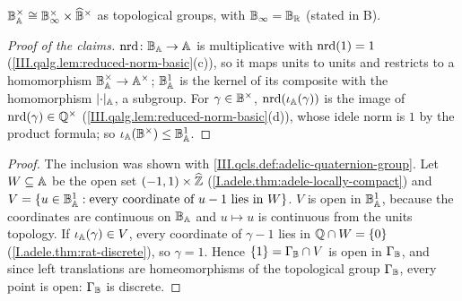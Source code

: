 \begin{definition}
\end{definition}
\noindent $\mathbb{B}_{\mathbb{A}}^\times\cong\mathbb{B}_{\infty}^\times\times\widehat{\mathbb{B}}^\times$ as topological groups, with $\mathbb{B}_{\infty}=\mathbb{B}_{\mathbb{R}}$ (stated in B).
\begin{proof}[Proof of the claims]
$\operatorname{nrd}\colon\mathbb{B}_{\mathbb{A}}\to\mathbb{A}$ is multiplicative with $\operatorname{nrd}(1)=1$ (\cref{III.qalg.lem:reduced-norm-basic}(c)), so it maps units to units and restricts to a
homomorphism $\mathbb{B}_{\mathbb{A}}^\times\to\mathbb{A}^\times$; $\mathbb{B}_{\mathbb{A}}^1$ is the kernel of its composite with the homomorphism $\lvert\cdot\rvert_{\mathbb{A}}$, a subgroup. For $\gamma\in\mathbb{B}^\times$,
$\operatorname{nrd}(\iota_{\mathbb{A}}(\gamma))$ is the image of $\operatorname{nrd}(\gamma)\in\mathbb{Q}^\times$ (\cref{III.qalg.lem:reduced-norm-basic}(d)), whose idele norm is $1$ by the product
formula; so $\iota_{\mathbb{A}}(\mathbb{B}^\times)\le\mathbb{B}_{\mathbb{A}}^1$.
\end{proof}

\begin{theorem}[discreteness]
\end{theorem}
\begin{proof}
The inclusion was shown with \cref{III.qcls.def:adelic-quaternion-group}. Let $W\subseteq\mathbb{A}$ be the open set $(-1,1)\times\widehat{\mathbb{Z}}$
(\cref{I.adele.thm:adele-locally-compact}) and $V=\{u\in\mathbb{B}_{\mathbb{A}}^1:\text{every coordinate of }u-1\text{ lies in }W\}$. $V$ is open in $\mathbb{B}_{\mathbb{A}}^1$, because the
coordinates are continuous on $\mathbb{B}_{\mathbb{A}}$ and $u\mapsto u$ is continuous from the units topology. If $\iota_{\mathbb{A}}(\gamma)\in V$, every coordinate of $\gamma-1$ lies in
$\mathbb{Q}\cap W=\{0\}$ (\cref{I.adele.thm:rat-discrete}), so $\gamma=1$. Hence $\{1\}=\Gamma_{\mathbb{B}}\cap V$ is open in $\Gamma_{\mathbb{B}}$, and since left translations are
homeomorphisms of the topological group $\Gamma_{\mathbb{B}}$, every point is open: $\Gamma_{\mathbb{B}}$ is discrete.
\end{proof}

